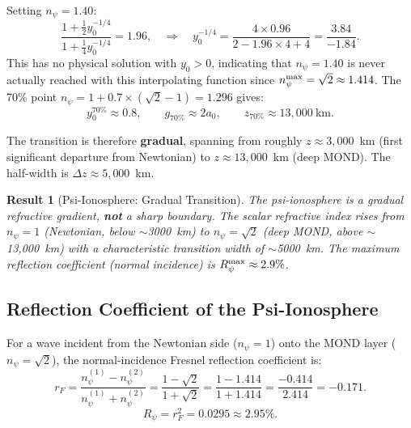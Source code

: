 \documentclass[aps,prd,twocolumn,superscriptaddress]{revtex4-2}
\newcommand{\npsi}{n_\psi}
\newtheorem{result}{Result}
\begin{document}
Setting $\npsi = 1.40$:
\begin{equation}
\frac{1+\frac{1}{2}y_0^{-1/4}}{1+\frac{1}{4}y_0^{-1/4}} = 1.96,
\quad\Rightarrow\quad
y_0^{-1/4} = \frac{4\times0.96}{2-1.96\times4+4} = \frac{3.84}{-1.84}.
\end{equation}
This has no physical solution with $y_0 > 0$, indicating that
$\npsi = 1.40$ is never actually reached with this interpolating function
since $\npsi^{\rm max} = \sqrt{2} \approx 1.414$. The 70\% point
$\npsi = 1 + 0.7\times(\sqrt{2}-1) = 1.296$ gives:
\begin{equation}
y_0^{70\%} \approx 0.8, \qquad g_{70\%} \approx 2a_0,
\qquad z_{70\%} \approx 13{,}000~\text{km}.
\end{equation}

The transition is therefore \textbf{gradual}, spanning from roughly
$z \approx 3{,}000$~km (first significant departure from Newtonian)
to $z \approx 13{,}000$~km (deep MOND).  The half-width is
$\Delta z \approx 5{,}000$~km.

\begin{result}[Psi-Ionosphere: Gradual Transition]
The psi-ionosphere is a gradual refractive gradient, \textbf{not} a
sharp boundary.  The scalar refractive index rises from $\npsi = 1$
(Newtonian, below $\sim$3000~km) to $\npsi = \sqrt{2}$ (deep MOND,
above $\sim$13{,}000~km) with a characteristic transition width of
$\sim$5000~km.  The maximum reflection coefficient (normal incidence)
is $R_\psi^{\rm max} \approx 2.9\%$.
\end{result}

\subsection{Reflection Coefficient of the Psi-Ionosphere}

For a wave incident from the Newtonian side ($\npsi = 1$) onto the MOND
layer ($\npsi = \sqrt{2}$), the normal-incidence Fresnel reflection
coefficient is:
\begin{equation}
r_F = \frac{\npsi^{(1)} - \npsi^{(2)}}{\npsi^{(1)} + \npsi^{(2)}}
= \frac{1 - \sqrt{2}}{1 + \sqrt{2}}
= \frac{1-1.414}{1+1.414} = \frac{-0.414}{2.414} = -0.171.
\label{eq:fresnel}
\end{equation}
\begin{equation}
R_\psi = r_F^2 = 0.0295 \approx 2.95\%.
\label{eq:R-psi}
\end{equation}
\end{document}
